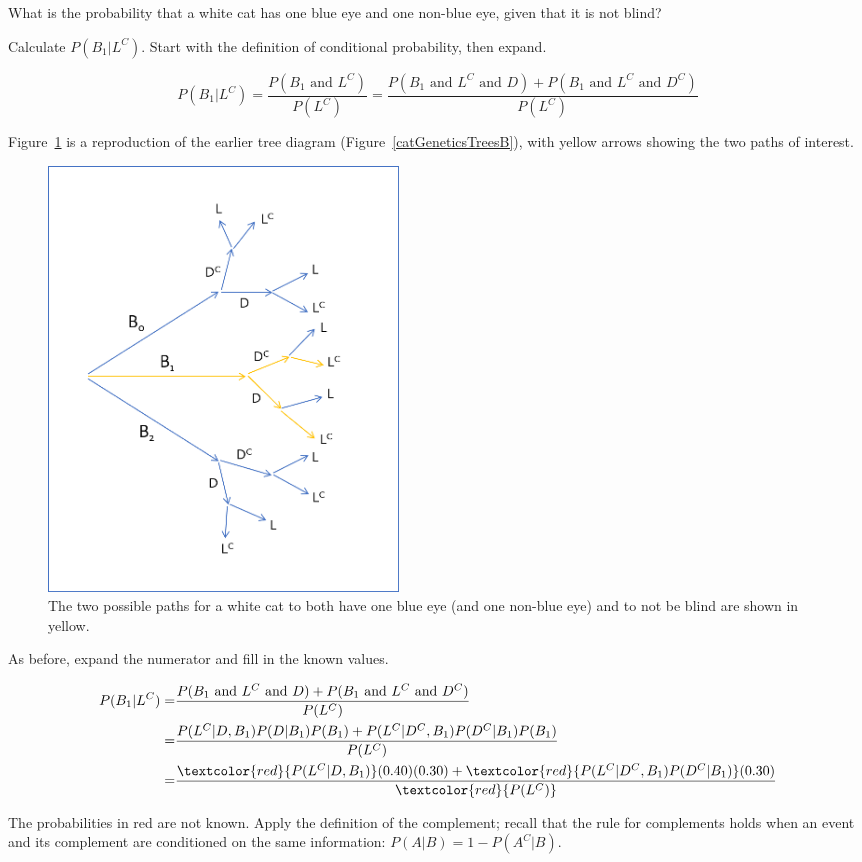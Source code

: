 \begin{example}{What is the probability that a white cat has one blue eye and one non-blue eye, given that it is not blind?}

Calculate $P(B_1|L^C)$. Start with the definition of conditional probability, then expand.

\[P(B_1|L^C) = \dfrac{P(B_1 \textrm{ and } L^C)}{P(L^C)} = \frac{P(B_1 \textrm{ and } L^C \textrm{ and } D) + P(B_1 \textrm{ and } L^C \textrm{ and } D^C)}{P(L^C)} \]


Figure~\ref{catGeneticsTreesC} is a reproduction of the earlier tree diagram (Figure~\ref{catGeneticsTreesB}), with yellow arrows showing the two paths of interest.
	
	\begin{figure}[h!]
	\centering
	\includegraphics[width=0.45\textwidth]{ch_probability_oi_biostat/figures/catGeneticsTrees/catGeneticsTreesC}
	\caption{The two possible paths for a white cat to both have one blue eye (and one non-blue eye) and to not be blind are shown in yellow.}
	\label{catGeneticsTreesC}
	\end{figure}
	
	As before, expand the numerator and fill in the known values.
	
	\begin{align*}
	P(B_1|L^C) =& \frac{P(B_1 \textrm{ and } L^C \textrm{ and } D) + P(B_1 \textrm{ and } L^C \textrm{ and } D^C)}{P(L^C)}\\
	=& \frac{P(L^C|D, B_1)P(D|B_1)P(B_1) + P(L^C|D^C, B_1)P(D^C|B_1)P(B_1)}{P(L^C)} \\
	=& \frac{\textcolor{red}{P(L^C|D, B_1)}(0.40)(0.30) + \textcolor{red}{P(L^C|D^C, B_1)P(D^C|B_1)}(0.30)}{\textcolor{red}{P(L^C)}}
	\end{align*} 
	
	The probabilities in red are not known. Apply the definition of the complement; recall that the rule for complements holds when an event and its complement are conditioned on the same information: $P(A|B) = 1 - P(A^C|B)$.
	

\end{example}
